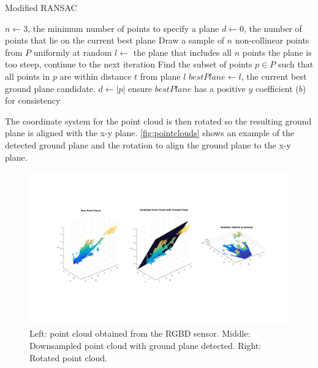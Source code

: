 \begin{algorithm}
\caption{Modified RANSAC}
\label{alg:modifiedRansac}
\begin{algorithmic}[1]
\Statex
{}
    \State $n \gets 3$, the minimum number of points to specify a plane
    \State $d \gets 0$, the number of points that lie on the current best plane
        \State Draw a sample of $n$ non-collinear points from $P$ uniformly at random
        \State $l \gets$ the plane that includes all $n$ points
            \State the plane is too steep, continue to the next iteration
        \EndIf
        \State Find the subset of points $p \in P$ such that all points in $p$ are
        within distance $t$ from plane $l$
            \State $bestPlane \gets l$, the current best ground plane candidate.
            \State $d \gets |p|$
        \EndIf
    \EndFor
    \State ensure $bestPlane$ has a positive $y$ coefficient ($b$) for consistency
\EndFunction
\Statex
{}
\end{algorithmic}
\end{algorithm}

The coordinate system for the point cloud is then rotated so the resulting
ground plane is aligned with the x-y plane. \autoref{fig:pointclouds} shows an
example of the detected ground plane and the rotation to align the ground plane
to the x-y plane.

\begin{figure}
\centering
\includegraphics[width=6in]{figures/pointclouds.png}
\caption{Left: point cloud obtained from the RGBD sensor. Middle:
Downsampled point cloud with ground plane detected. Right: Rotated point cloud.}
\label{fig:pointclouds}
\end{figure}

